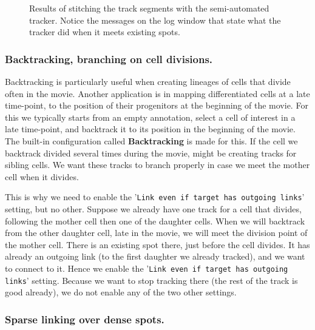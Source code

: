 \begin{figure}
    \hfill\null
    \caption{Results of stitching the track segments with the semi-automated tracker. Notice the messages on the log window that state what the tracker did when it meets existing spots.}
    \label{fig:Tracklets}
\end{figure}

\subsubsection{Backtracking, branching on cell divisions. }

Backtracking is particularly useful when creating lineages of cells that divide often in the movie.
Another application is in mapping differentiated cells at a late time-point, to the position of their progenitors at the beginning of the movie. 
For this we typically starts from an empty annotation, select a cell of interest in a late time-point, and backtrack it to its position in the beginning of the movie.
The built-in configuration called \textbf{Backtracking} is made for this.
If the cell we backtrack divided several times during the movie, might be creating tracks for sibling cells.
We want these tracks to branch properly in case we meet the mother cell when it divides.

This is why we need to enable the '\texttt{Link even if target has outgoing links}' setting, but no other.
Suppose we already have one track for a cell that divides, following the mother cell then one of the daughter cells. 
When we will backtrack from the other daughter cell, late in the movie, we will meet the division point of the mother cell. 
There is an existing spot there, just before the cell divides. 
It has already an outgoing link (to the first daughter we already tracked), and we want to connect to it. 
Hence we enable the '\texttt{Link even if target has outgoing links}' setting.
Because we want to stop tracking there (the rest of the track is good already), we do not enable any of the two other settings.



\subsubsection{Sparse linking over dense spots.}
